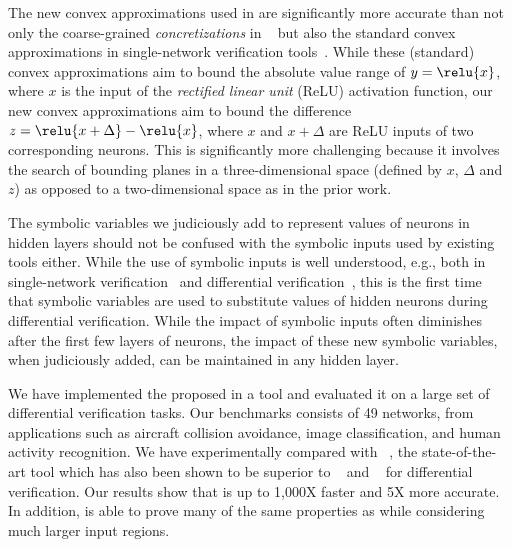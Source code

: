 The new convex approximations used in \Name{} are significantly more
accurate than not only the coarse-grained \emph{concretizations}
in \ReluDiff{}~\cite{paulsen2020reludiff} but also the standard convex
approximations in single-network verification tools~\cite{SinghGPV19,
Singh2019krelu, WangPWYJ18nips, zhang2018efficient}.
%
While these (standard) convex approximations aim to bound the absolute
value range of $ y = \relu{x} $, where $x$ is the input of
the \textit{rectified linear unit} (ReLU) activation function, our new
convex approximations aim to bound the difference $ z = \relu{x
+ \Delta} - \relu{x} $, where $x$ and $x+\Delta$ are ReLU inputs of
two corresponding neurons.
%
This is significantly more challenging because it involves the search
of bounding planes in a three-dimensional space (defined by $x$,
$\Delta$ and $z$) as opposed to a two-dimensional space as in the
prior work.


The symbolic variables we judiciously add to represent values of
neurons in hidden layers should not be confused with the symbolic
inputs used by existing tools either.
%
While the use of symbolic inputs is well understood, e.g., both in
single-network verification~\cite{SinghGPV19, Singh2019krelu,
WangPWYJ18nips, zhang2018efficient} and differential
verification~\cite{paulsen2020reludiff}, this is the first time that symbolic
variables are used to substitute values of hidden neurons during
differential verification.
%
While the impact of symbolic inputs often diminishes after the first
few layers of neurons, the impact of these new symbolic variables,
when judiciously added, can be maintained in any hidden layer.


We have implemented the proposed \Name{} in a tool and evaluated it on
a large set of differential verification tasks. Our benchmarks
consists of 49 networks, from applications such as aircraft collision
avoidance, image classification, and human activity recognition.  We
have experimentally compared with \ReluDiff{}~\cite{paulsen2020reludiff}, the
state-of-the-art tool which has also been shown to be superior to
\ReluVal{}~\cite{WangPWYJ18} and \DeepPoly{}~\cite{SinghGPV19} for differential
verification.
%
Our results show that \Name{} is up to 1,000X faster and 5X more
accurate.  In addition, \Name{} is able to prove many of the same properties
as \ReluDiff{} while considering much larger input regions.


